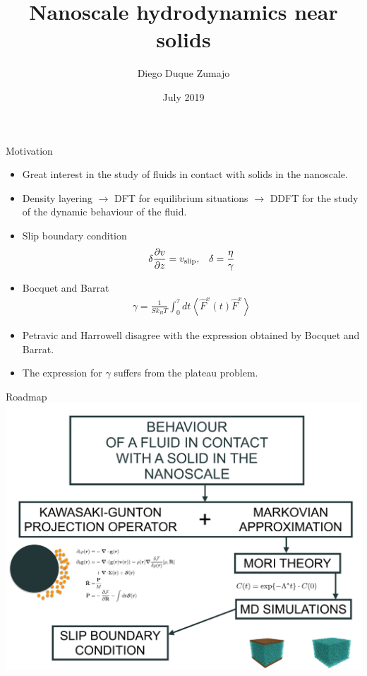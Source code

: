 \documentclass{beamer}
\title{Nanoscale hydrodynamics near solids}
\date{July 2019}
\author{Diego Duque Zumajo}
\institute{Departamento Física Fundamental \\Universidad Nacional de Educación a Distancia}
\newcommand{\llangle}{\left\langle}
\newcommand{\rrangle}{\right\rangle}
\begin{document}
\maketitle

\begin{frame}{Motivation}
  \begin{itemize}
    \item Great interest in the study of fluids in contact with solids in the nanoscale.
        \item Density layering $\rightarrow$ DFT for equilibrium situations $\rightarrow$ DDFT for the study of the dynamic behaviour of the fluid. 
        \item Slip boundary condition
          \begin{align}
            \delta\frac{\partial v}{\partial z}=v_{\rm slip}, && \delta =\frac{\eta}{\gamma} \nonumber
          \end{align}
        \item Bocquet and Barrat \cite{Bocquet1993}
\begin{align}
  \gamma=\frac{1}{Sk_BT}\int_0^{\tau} dt \llangle \hat{F}^x(t)\hat{F}^x\rrangle
\nonumber
\end{align}
      \item Petravic and Harrowell \cite{Petravic2007} disagree with the expression obtained by Bocquet and Barrat.
      \item The expression for $\gamma$ suffers from the plateau problem. 
    \end{itemize}
\end{frame}

\begin{frame}{Roadmap}
  \includegraphics[width=\linewidth]{scheme-thesis}
\end{frame}
\end{document}
